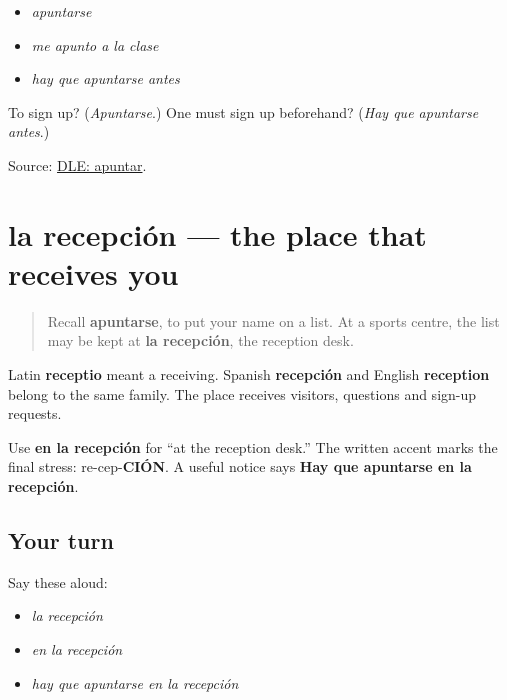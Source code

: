 \begin{itemize}
\raggedright
  \item \emph{apuntarse}
  \item \emph{me apunto a la clase}
  \item \emph{hay que apuntarse antes}
\end{itemize}

\begin{tcolorbox}[breakable,colback=teal!4,colframe=teal!35!black,title={Before you move on}]
To sign up? (\emph{Apuntarse}.) One must sign up beforehand? (\emph{Hay que apuntarse antes}.)

Source: \href{https://dle.rae.es/apuntar}{DLE: apuntar}.
\end{tcolorbox}
\section[la recepción]{la recepción — the place that receives you}

\label{lesson:ES-C414-recepcion}



\begin{quote}
Recall \textbf{apuntarse}, to put your name on a list. At a sports centre, the list may be kept at \textbf{la recepción}, the reception desk.
\end{quote}

\begin{cousinweb}
Latin \textbf{receptio} meant a receiving. Spanish \textbf{recepción} and English \textbf{reception} belong to the same family. The place receives visitors, questions and sign-up requests.
\end{cousinweb}

\begin{grammarlens}[title={Grammar Lens: place after en}]
Use \textbf{en la recepción} for “at the reception desk.” The written accent marks the final stress: re-cep-\textbf{CIÓN}. A useful notice says \textbf{Hay que apuntarse en la recepción}.
\end{grammarlens}

\subsection*{Your turn}
Say these aloud:

\begin{itemize}
\raggedright
  \item \emph{la recepción}
  \item \emph{en la recepción}
  \item \emph{hay que apuntarse en la recepción}
\end{itemize}

